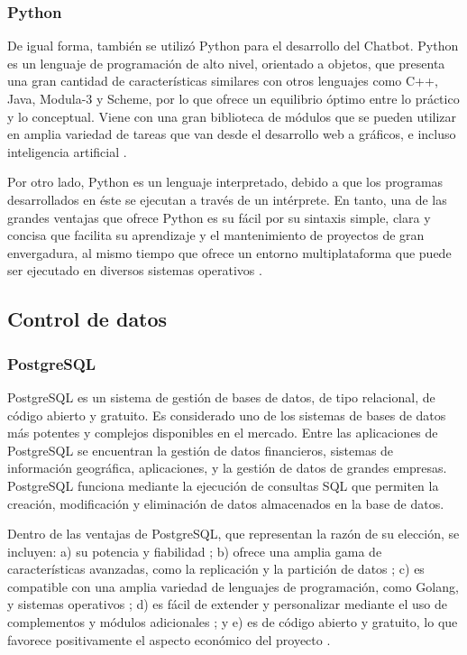 \subsubsection{Python}
De igual forma, también se utilizó Python para el desarrollo del Chatbot. Python es un lenguaje de programación de alto nivel, orientado a objetos, que presenta una gran cantidad de características similares con otros lenguajes como C++, Java, Modula-3 y Scheme, por lo que ofrece un equilibrio óptimo entre lo práctico y lo conceptual. Viene con una gran biblioteca de módulos que se pueden utilizar en amplia variedad de tareas que van desde el desarrollo web a gráficos, e incluso inteligencia artificial \cite{book:mckinney_python} \cite{book:mitchell_r}. 

Por otro lado, Python es un lenguaje interpretado, debido a que los programas desarrollados en éste se ejecutan a través de un intérprete. En tanto, una de las grandes ventajas que ofrece Python es su fácil por su sintaxis simple, clara y concisa que facilita su aprendizaje y el mantenimiento de proyectos de gran envergadura, al mismo tiempo que ofrece un entorno multiplataforma que puede ser ejecutado en diversos sistemas operativos \cite{book:mitchell_r}.

\subsection{Control de datos}

\subsubsection{PostgreSQL}
PostgreSQL es un sistema de gestión de bases de datos, de tipo relacional, de código abierto y gratuito. Es considerado uno de los sistemas de bases de datos más potentes y complejos disponibles en el mercado. Entre las aplicaciones de PostgreSQL se encuentran la gestión de datos financieros, sistemas de información geográfica, aplicaciones, y la gestión de datos de grandes empresas. PostgreSQL funciona mediante la ejecución de consultas SQL que permiten la creación, modificación y eliminación de datos almacenados en la base de datos.

Dentro de las ventajas de PostgreSQL, que representan la razón de su elección, se incluyen: a) su potencia y fiabilidad \cite{book:momjian_b}; b) ofrece una amplia gama de características avanzadas, como la replicación y la partición de datos \cite{book:Obe}; c) es compatible con una amplia variedad de lenguajes de programación, como Golang, y sistemas operativos \cite{book:fontaine}; d) es fácil de extender y personalizar mediante el uso de complementos y módulos adicionales \cite{book:schoning}; y e) es de código abierto y gratuito, lo que favorece positivamente el aspecto económico del proyecto \cite{book:momjian_b}.

